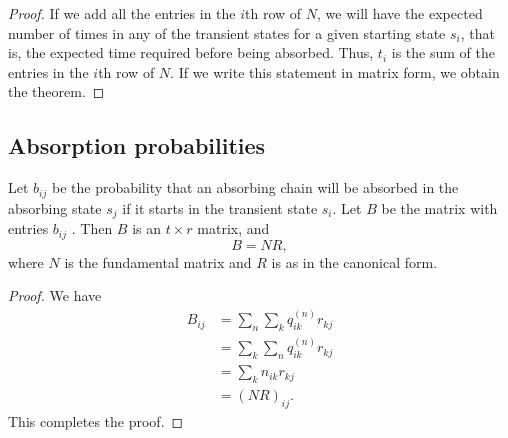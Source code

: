\begin{proof}
If we add all the entries in the $i$th row of $N$, we will have the expected number of times in any of the transient states for a given starting state $s_i$, that is, the expected time required before being absorbed. Thus, $t_i$ is the sum of the entries in the $i$th row of $N$. If we write this statement in matrix form, we obtain the theorem.
\end{proof}

\subsection{Absorption probabilities}
\begin{theorem}
Let $b_{ij}$ be the probability that an absorbing chain will be absorbed in the absorbing state $s_j$ if it starts in the transient state $s_i$. Let $B$ be the matrix with entries $b_{ij}$ . Then $B$ is an $t\times r$ matrix, and
\begin{equation*}
    B = NR,
\end{equation*}
where $N$ is the fundamental matrix and $R$ is as in the canonical form.
\end{theorem}

\begin{proof}
We have 
\begin{equation*}
    \begin{aligned} 
        B_{i j} &=\sum_{n} \sum_{k} q_{i k}^{(n)} r_{k j} \\ &=\sum_{k} \sum_{n} q_{i k}^{(n)} r_{k j} \\ &=\sum_{k} n_{i k} r_{k j} \\ &=(N R)_{i j}.
    \end{aligned}
\end{equation*}
This completes the proof.
\end{proof}

